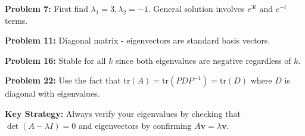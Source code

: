 \documentclass[12pt]{article}
\begin{document}
\textbf{Problem 7:} First find $\lambda_{1} = 3, \lambda_{2} = -1$. General solution involves $e^{3t}$ and $e^{-t}$ terms.

\textbf{Problem 11:} Diagonal matrix - eigenvectors are standard basis vectors.

\textbf{Problem 16:} Stable for all $k$ since both eigenvalues are negative regardless of $k$.

\textbf{Problem 22:} Use the fact that $\text{tr}(A) = \text{tr}(PDP^{-1}) = \text{tr}(D)$ where $D$ is diagonal with eigenvalues.

\textbf{Key Strategy:} Always verify your eigenvalues by checking that $\det(A - \lambda I) = 0$ and eigenvectors by confirming $A\mathbf{v} = \lambda\mathbf{v}$.
\end{document}
